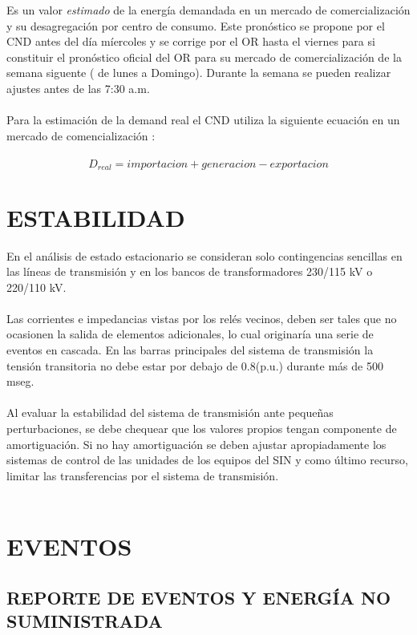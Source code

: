 \documentclass[a5paper]{book}%
\begin{document}
Es un valor \textit{estimado} de la energía demandada en un mercado de
comercialización y su desagregación por centro de consumo. Este
pronóstico se propone por el CND antes del día míercoles y se corrige
por el OR hasta el viernes para si constituir el pronóstico oficial
del OR para su mercado de comercialización de la semana siguente ( de
lunes a Domingo). Durante la semana se pueden realizar ajustes antes
de las 7:30 a.m.\\\\
Para la estimación de la demand real el CND utiliza la siguiente
ecuación en un mercado de comencialización :\\\\
\[D_{real} = importacion + generacion - exportacion \]




\chapter{ESTABILIDAD}
 En el análisis de estado estacionario se consideran solo
  contingencias sencillas en las líneas de transmisión y en los bancos
  de transformadores 230/115 kV o 220/110 kV.\\\\
	
	
 Las corrientes e impedancias vistas por los relés vecinos, deben
  ser tales que no ocasionen la salida de elementos adicionales, lo
  cual originaría una serie de eventos en cascada.  En las barras
  principales del sistema de transmisión la tensión transitoria no
  debe estar por debajo de 0.8(p.u.) durante más de 500 mseg.\\\\
	
 Al evaluar la estabilidad del sistema de transmisión ante
  pequeñas perturbaciones, se debe chequear que los valores propios
  tengan componente de amortiguación. Si no hay amortiguación se deben
  ajustar apropiadamente los sistemas de control de las unidades de
  los equipos del SIN y como último recurso, limitar las
  transferencias por el sistema de transmisión.\\\\


  \chapter{EVENTOS}

\section{REPORTE DE EVENTOS Y ENERGÍA NO SUMINISTRADA}
\end{document}
